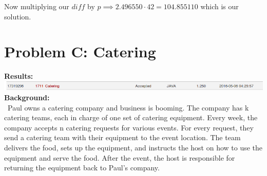 \documentclass[12pt]{article}
\begin{document}
\begin{table}[H]
	\centering
\end{table}

Now multiplying our $diff$ by $p \implies 2.496550 \cdot 42 = 104.855110$ which is our solution.
\newpage
















\section{Problem C: Catering}
\noindent \textbf{Results:} \\

\includegraphics[width=\textwidth]{ProblemC} \\

\noindent \textbf{Background:} \\
~\indent Paul owns a catering company and business is booming. The company has k catering teams, each in charge of
one set of catering equipment. Every week, the company accepts n catering requests for various events. For every
request, they send a catering team with their equipment to the event location. The team delivers the food, sets up
the equipment, and instructs the host on how to use the equipment and serve the food. After the event, the host is
responsible for returning the equipment back to Paul’s company.
\end{document}
